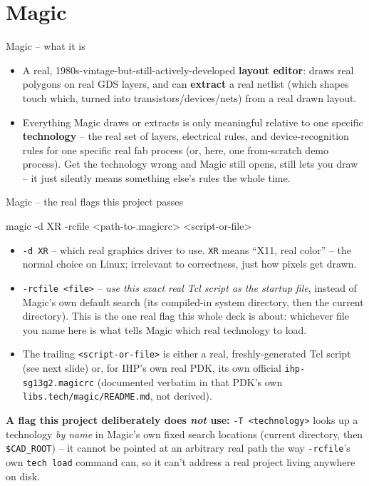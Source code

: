 \documentclass[aspectratio=169]{beamer}
\begin{document}
\section{Magic}
\begin{frame}{Magic -- what it is}
\begin{itemize}
  \item A real, 1980s-vintage-but-still-actively-developed
        \textbf{layout editor}: draws real polygons on real GDS
        layers, and can \textbf{extract} a real netlist (which shapes
        touch which, turned into transistors/devices/nets) from a
        real drawn layout.
  \item Everything Magic draws or extracts is only meaningful
        relative to one specific \textbf{technology} -- the real set
        of layers, electrical rules, and device-recognition rules for
        one specific real fab process (or, here, one from-scratch
        demo process). Get the technology wrong and Magic still
        opens, still lets you draw -- it just silently means
        something else's rules the whole time.
\end{itemize}
\end{frame}

\begin{frame}[fragile]{Magic -- the real flags this project passes}
\begin{cli}
magic -d XR -rcfile <path-to-.magicrc> <script-or-file>
\end{cli}
\begin{itemize}
  \item \texttt{-d XR} -- which real graphics driver to use.
        \texttt{XR} means ``X11, real color'' -- the normal choice on
        Linux; irrelevant to correctness, just how pixels get drawn.
  \item \texttt{-rcfile <file>} -- \emph{use this exact real Tcl
        script as the startup file}, instead of Magic's own default
        search (its compiled-in system directory, then the current
        directory). This is the one real flag this whole deck is
        about: whichever file you name here is what tells Magic which
        real technology to load.
  \item The trailing \texttt{<script-or-file>} is either a real,
        freshly-generated Tcl script (see next slide) or, for
        IHP's own real PDK, its own official
        \texttt{ihp-sg13g2.magicrc} (documented verbatim in that
        PDK's own \texttt{libs.tech/magic/README.md}, not derived).
\end{itemize}
\textbf{A flag this project deliberately does \emph{not} use:}
\texttt{-T <technology>} looks up a technology \emph{by name} in
Magic's own fixed search locations (current directory, then
\texttt{\$CAD\_ROOT}) -- it cannot be pointed at an arbitrary real
path the way \texttt{-rcfile}'s own \texttt{tech load} command can, so
it can't address a real project living anywhere on disk.
\end{frame}
\end{document}
